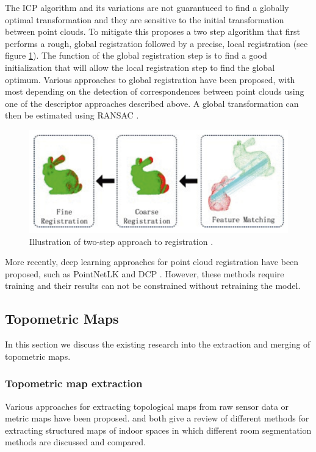 The ICP algorithm and its variations are not guarantueed to find a globally optimal transformation and they are sensitive to the initial transformation between point clouds. To mitigate this \citet{yang_fast_2016} proposes a two step algorithm that first performs a rough, global registration followed by a precise, local registration (see figure \ref{fig:global_local}). The function of the global registration step is to find a good initialization that will allow the local registration step to find the global optimum. Various approaches to global registration have been proposed, with most depending on the detection of correspondences between point clouds using one of the descriptor approaches described above. A global transformation can then be estimated using RANSAC \citep{koguciuk_parallel_2017}.

\begin{figure}[h]
    \centering
    \includegraphics*[width=.8\textwidth]{./fig/feature_matching.png}
    \caption{Illustration of two-step approach to registration \citep{yang_fast_2016}.}
    \label{fig:global_local}
\end{figure}

More recently, deep learning approaches for point cloud registration have been proposed, such as PointNetLK and DCP \citep{aoki_pointnetlk_2019,wang_deep_2019}. However, these methods require training and their results can not be constrained without retraining the model.

\pagebreak

\subsection{Topometric Maps}
In this section we discuss the existing research into the extraction and merging of topometric maps.

\subsubsection{Topometric map extraction}
Various approaches for extracting topological maps from raw sensor data or metric maps have been proposed. \citet{bormann_room_2016} and \citet{pintore_state---art_2020} both give a review of different methods for extracting structured maps of indoor spaces in which different room segmentation methods are discussed and compared.

